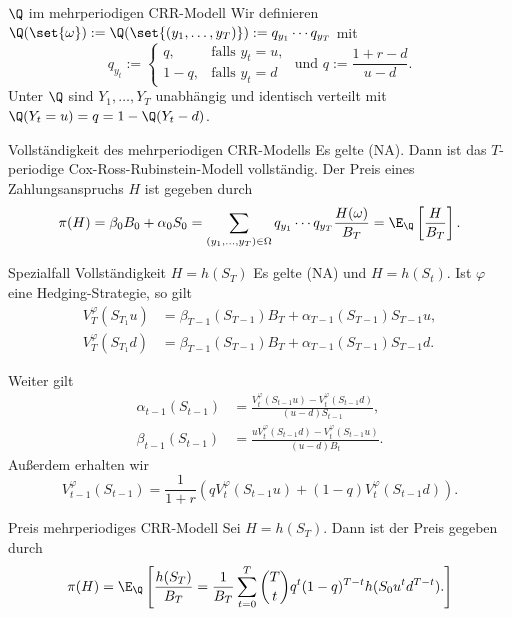 \begin{karte}{\(\Q\) im mehrperiodigen CRR-Modell}
Wir definieren \(\Q(\set{\omega}) := \Q(\set{(y_1, \ldots, y_T)}) := q_{y_1} \cdots q_{y_T}\)
mit 
\[ q_{y_t} := \begin{cases}
    q, &\text{falls } y_t = u,\\
    1-q, &\text{falls } y_t = d
\end{cases} \text{ und } q := \frac{1+r-d}{u-d}. \]
Unter \(\Q\) sind \(Y_1, \ldots, Y_T\) unabhängig und identisch verteilt mit \(\Q(Y_t = u) = q = 1-\Q(Y_t - d)\).
\end{karte}

\begin{karte}{Vollständigkeit des mehrperiodigen CRR-Modells}
Es gelte (NA). Dann ist das \(T\)-periodige Cox-Ross-Rubinstein-Modell 
vollständig. Der Preis eines Zahlungsanspruchs \(H\) ist gegeben durch 
\[ \pi(H) = \beta_0 B_0 + \alpha_0 S_0 = \sum_{(y_1, \ldots, y_T)\in \Omega} q_{y_1} \cdots q_{y_T} \frac{H(\omega)}{B_T} 
= \E_\Q \left[\frac{H}{B_T}\right]. \]
\end{karte}

\begin{karte}{Spezialfall Vollständigkeit \(H = h(S_T)\)}
Es gelte (NA) und \(H = h(S_t)\). Ist \(\varphi\) eine Hedging-Strategie, so gilt 
\begin{align*}
    V_T^\varphi(S_{T_1} u) &= \beta_{T-1}(S_{T-1})B_T + \alpha_{T-1}(S_{T-1}) S_{T-1} u, \\
    V_T^\varphi(S_{T_1} d) &= \beta_{T-1}(S_{T-1})B_T + \alpha_{T-1}(S_{T-1}) S_{T-1} d.
\end{align*}

Weiter gilt 
\begin{align*}
    \alpha_{t-1}(S_{t-1}) &= \frac{V_t^\varphi(S_{t-1} u) - V_t^\varphi(S_{t-1}d)}{(u-d)S_{t-1}}, \\
    \beta_{t-1}(S_{t-1}) &= \frac{uV_t^\varphi(S_{t-1} d) - V_t^\varphi(S_{t-1}u)}{(u-d) B_t}.
\end{align*}
Außerdem erhalten wir 
\[ V_{t-1}^\varphi(S_{t-1}) = \frac{1}{1+r} (q V_t^\varphi(S_{t-1} u) + (1-q)V_t^\varphi (S_{t-1}d)). \]
\end{karte}

\begin{karte}{Preis mehrperiodiges CRR-Modell}
Sei \(H = h(S_T)\). Dann ist der Preis gegeben durch 
\[ \pi(H) = \E_\Q\left[ \frac{h(S_T)}{B_T} = \frac{1}{B_T} \sum_{t=0}^T \binom{T}{t} q^t (1-q)^{T-t} h(S_0 u^t d^{T-t}). \right] \]
\end{karte}

